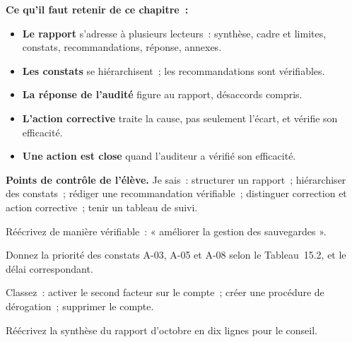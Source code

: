 \separateur

\begin{boxresume}
\textbf{Ce qu'il faut retenir de ce chapitre~:}
\begin{itemize}
    \item \textbf{Le rapport} s'adresse à plusieurs lecteurs~: synthèse,
          cadre et limites, constats, recommandations, réponse, annexes.
    \item \textbf{Les constats} se hiérarchisent~; les recommandations sont
          vérifiables.
    \item \textbf{La réponse de l'audité} figure au rapport, désaccords
          compris.
    \item \textbf{L'action corrective} traite la cause, pas seulement
          l'écart, et vérifie son efficacité.
    \item \textbf{Une action est close} quand l'auditeur a vérifié son
          efficacité.
\end{itemize}
\end{boxresume}

\begin{boxinfo}
\textbf{Points de contrôle de l'élève.} Je sais~: structurer un rapport~;
hiérarchiser des constats~; rédiger une recommandation vérifiable~;
distinguer correction et action corrective~; tenir un tableau de suivi.
\end{boxinfo}

\bigskip

\begin{boxexo}[title={\ding{45}\quad Exercice~15.1. Vérifiable \niveaubase}]
Réécrivez de manière vérifiable~: « améliorer la gestion des sauvegardes ».
\end{boxexo}

\begin{boxexo}[title={\ding{45}\quad Exercice~15.2. Priorité \niveaubase}]
Donnez la priorité des constats A-03, A-05 et A-08 selon le
Tableau~15.2, et le délai correspondant.
\end{boxexo}

\begin{boxexo}[title={\ding{45}\quad Exercice~15.3. Correction ou action corrective \niveaubase}]
Classez~: activer le second facteur sur le compte~; créer une procédure de
dérogation~; supprimer le compte.
\end{boxexo}

\begin{boxexo}[title={\ding{45}\quad Exercice~15.4. La synthèse \niveaumoyen}]
Réécrivez la synthèse du rapport d'octobre en dix lignes pour le conseil.
\end{boxexo}

